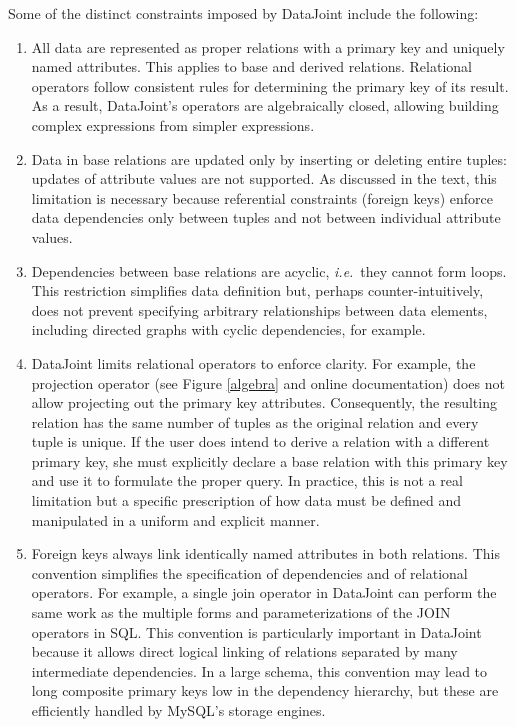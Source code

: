 \documentclass[10pt,letterpaper]{article}
\begin{document}
Some of the distinct constraints imposed by DataJoint include the following:
\begin{enumerate}

\item
All data are represented as proper relations with a primary key and uniquely named attributes. 
This applies to base and derived relations. 
Relational operators follow consistent rules for determining the primary key of its result. 
As a result, DataJoint's operators are algebraically closed, allowing building complex expressions from simpler expressions.

\item
Data in base relations are updated only by inserting or deleting entire tuples: updates of attribute values are not supported.
As discussed in the text, this limitation is necessary because referential constraints (foreign keys) enforce data dependencies only between tuples and not between individual attribute values. 

\item 
Dependencies between base relations are acyclic, \emph{i.e.}\ they cannot form loops. 
This restriction simplifies data definition but, perhaps counter-intuitively, does not prevent specifying arbitrary relationships between data elements, including directed graphs with cyclic dependencies, for example.

\item
DataJoint limits relational operators to enforce clarity.
For example, the projection operator (see Figure \ref{algebra} and online documentation) does not allow projecting out the primary key attributes.
Consequently, the resulting relation has the same number of tuples as the original relation and every tuple is unique.
If the user does intend to derive a relation with a different primary key, she must explicitly declare a base relation with this primary key and use it to formulate the proper query.
In practice, this is not a real limitation but a specific prescription of how data must be defined and manipulated in a uniform and explicit manner.

\item
Foreign keys always link identically named attributes in both relations.
This convention simplifies the specification of dependencies and of relational operators.
For example, a single join operator in DataJoint can perform the same work as the multiple forms and parameterizations of the JOIN operators in SQL.
This convention is particularly important in DataJoint because it allows direct logical linking of relations separated by many intermediate dependencies.
In a large schema, this convention may lead to long composite primary keys low in the dependency hierarchy, but these are efficiently handled by MySQL's storage engines.

\end{enumerate}
\end{document}
